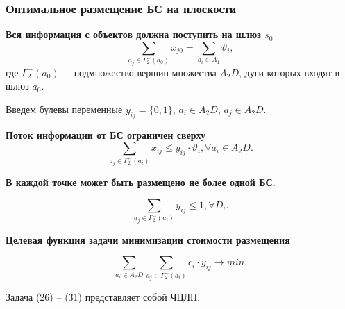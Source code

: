\begin{frame}
    \frametitle{Оптимальное размещение БС на плоскости}
    \fontsize{8pt}{7.2}\selectfont

    \textbf{Вся информация с объектов  должна поступить на шлюз $s_0$} 
    \begin{equation}\label{eq:part3_device2gateway_flow}
        \sum_{a_j \in \Gamma_2^-(a_0)} x_{j0} = \sum_{a_i \in A_1} \vartheta_i,
    \end{equation}
    где $\Gamma_2^-(a_0)$ –- подмножество вершин множества $A_2D$, дуги которых входят в шлюз $a_0$.

    \bigskip

    Введем булевы переменные $y_{ij} = \{0,1\}$, $a_i \in A_2D$, $a_j \in A_2D$. 

    \bigskip

    \textbf{Поток информации от БС ограничен сверху}
    \begin{equation}\label{eq:part3_flow_link_sta}
        \sum_{a_j \in \Gamma_2^-(a_i)} x_{ij} \leqslant y_{ij} \cdot \vartheta_i, \forall a_i \in A_2D.
    \end{equation}

    \bigskip 
    \textbf{В каждой точке может быть размещено не более одной БС.} 

    \begin{equation}\label{eq:part3_only_1_link_yij}
        \sum_{a_j \in \Gamma_2^-(a_i)} y_{ij} \leqslant 1, \forall D_i.
    \end{equation}

    \textbf{Целевая функция задачи минимизации стоимости размещения} 

    \begin{equation}\label{eq:part3_of_min}
        \sum_{a_i \in A_2D} \sum_{a_j \in \Gamma_2^-(a_i)}c_i \cdot y_{ij} \to min.
    \end{equation}

    Задача (26) -- (31)   представляет собой ЧЦЛП. 

\end{frame}



